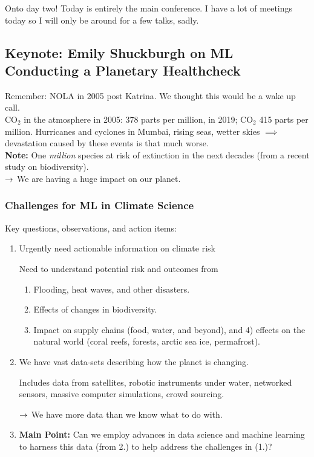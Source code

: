 Onto day two! Today is entirely the main conference. I have a lot of meetings today so I will only be around for a few talks, sadly. 


\subsection{Keynote: Emily Shuckburgh on ML Conducting a Planetary Healthcheck}

Remember: NOLA in 2005 post Katrina. We thought this would be a wake up call. \\

CO$_2$ in the atmosphere in 2005: 378 parts per million, in 2019; CO$_2$ 415 parts per million. Hurricanes and cyclones in Mumbai, rising seas, wetter skies $\implies$ devastation caused by these events is that much worse. \\

{\bf Note:} One {\it million} species at risk of extinction in the next decades (from a recent study on biodiversity). \\

$\rightarrow$ We are having a huge impact on our planet. \\


\subsubsection{Challenges for ML in Climate Science}

Key questions, observations, and action items:
\begin{enumerate}
    \item Urgently need actionable information on climate risk
    
    Need to understand potential risk and outcomes from
    \begin{enumerate}
        \item Flooding, heat waves, and other disasters.
        \item Effects of changes in biodiversity.
        \item Impact on supply chains (food, water, and beyond), and 4) effects on the natural world (coral reefs, forests, arctic sea ice, permafrost).
    \end{enumerate}
    
    \item We have vast data-sets describing how the planet is changing.
    
    Includes data from satellites, robotic instruments under water, networked sensors, massive computer simulations, crowd sourcing.
    
    $\rightarrow$ We have more data than we know what to do with.
    
    \item {\bf Main Point:} Can we employ advances in data science and machine learning to harness this data (from 2.) to help address the challenges in (1.)?
    
\end{enumerate}

